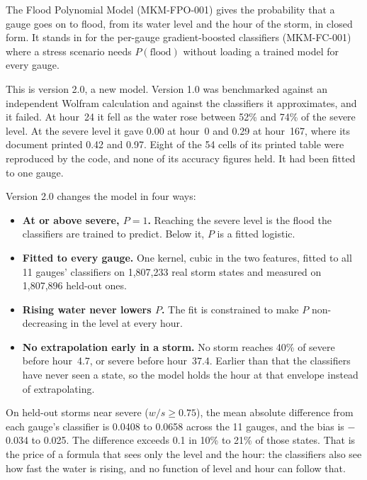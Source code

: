 \documentclass[11pt,a4paper]{article}
\newcommand{\fpNearMaeLo}{0.0408}
\newcommand{\fpNearMaeHi}{0.0658}
\newcommand{\fpNearBiasLo}{$-$0.034}
\newcommand{\fpNearBiasHi}{0.025}
\newcommand{\fpNearOverLo}{10}
\newcommand{\fpNearOverHi}{21}
\newcommand{\fpFitStates}{1{,}807{,}233}
\newcommand{\fpTestStates}{1{,}807{,}896}
\begin{document}
\sloppy

\mkmtitlepage
\mkmlegalpage

\tableofcontents
\clearpage

\mkmexecsummary

The Flood Polynomial Model (MKM-FPO-001) gives the probability that a gauge goes on to
flood, from its water level and the hour of the storm, in closed form. It stands in for
the per-gauge gradient-boosted classifiers (MKM-FC-001) where a stress scenario needs
$P(\text{flood})$ without loading a trained model for every gauge.

This is version 2.0, a new model. Version 1.0 was benchmarked against an independent
Wolfram calculation and against the classifiers it approximates, and it failed. At
hour~24 it fell as the water rose between 52\% and 74\% of the severe level. At the
severe level it gave 0.00 at hour~0 and 0.29 at hour~167, where its document printed
0.42 and 0.97. Eight of the 54 cells of its printed table were reproduced by the code,
and none of its accuracy figures held. It had been fitted to one gauge.

Version 2.0 changes the model in four ways:
\begin{itemize}[nosep]
    \item \textbf{At or above severe, $P=1$.} Reaching the severe level is the flood
          the classifiers are trained to predict. Below it, $P$ is a fitted logistic.
    \item \textbf{Fitted to every gauge.} One kernel, cubic in the two features,
          fitted to all 11 gauges' classifiers on \fpFitStates{} real storm states and
          measured on \fpTestStates{} held-out ones.
    \item \textbf{Rising water never lowers $P$.} The fit is constrained to make $P$
          non-decreasing in the level at every hour.
    \item \textbf{No extrapolation early in a storm.} No storm reaches 40\% of severe
          before hour~4.7, or severe before hour~37.4. Earlier than that the
          classifiers have never seen a state, so the model holds the hour at that
          envelope instead of extrapolating.
\end{itemize}

On held-out storms near severe ($w/s\ge0.75$), the mean absolute difference from each
gauge's classifier is \fpNearMaeLo{} to \fpNearMaeHi{} across the 11 gauges, and the
bias is \fpNearBiasLo{} to \fpNearBiasHi{}. The difference exceeds 0.1 in
\fpNearOverLo\% to \fpNearOverHi\% of those states. That is the price of a formula that
sees only the level and the hour: the classifiers also see how fast the water is
rising, and no function of level and hour can follow that.
\end{document}
